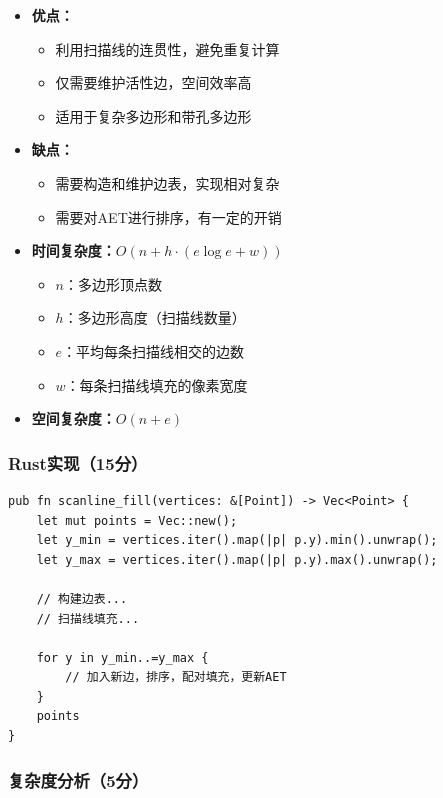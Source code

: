 ﻿\documentclass[12pt,a4paper]{article}
\begin{document}
\begin{tcolorbox}[breakable]
\begin{itemize}
\item \textbf{优点：}
  \begin{itemize}
  \item 利用扫描线的连贯性，避免重复计算
  \item 仅需要维护活性边，空间效率高
  \item 适用于复杂多边形和带孔多边形
  \end{itemize}
\item \textbf{缺点：}
  \begin{itemize}
  \item 需要构造和维护边表，实现相对复杂
  \item 需要对AET进行排序，有一定的开销
  \end{itemize}
\item \textbf{时间复杂度：}$O(n + h \cdot (e \log e + w))$
  \begin{itemize}
  \item $n$：多边形顶点数
  \item $h$：多边形高度（扫描线数量）
  \item $e$：平均每条扫描线相交的边数
  \item $w$：每条扫描线填充的像素宽度
  \end{itemize}
\item \textbf{空间复杂度：}$O(n + e)$
\end{itemize}
\end{tcolorbox}

\subsubsection{Rust实现（15分）}

\begin{lstlisting}
pub fn scanline_fill(vertices: &[Point]) -> Vec<Point> {
    let mut points = Vec::new();
    let y_min = vertices.iter().map(|p| p.y).min().unwrap();
    let y_max = vertices.iter().map(|p| p.y).max().unwrap();
    
    // 构建边表...
    // 扫描线填充...
    
    for y in y_min..=y_max {
        // 加入新边，排序，配对填充，更新AET
    }
    points
}
\end{lstlisting}

\subsubsection{复杂度分析（5分）}
\end{document}
